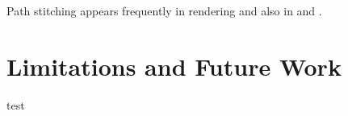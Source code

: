 \documentclass[a4paper,12pt]{article}
\begin{document}
\begin{related}
    Path stitching appears frequently in rendering and also in \cite{das_sarma_fast_2015}
    and \cite{ji_reusing_2012}.
\end{related}

\section{Limitations and Future Work}
test

\newpage
\printbibliography
\newpage

\end{document}

